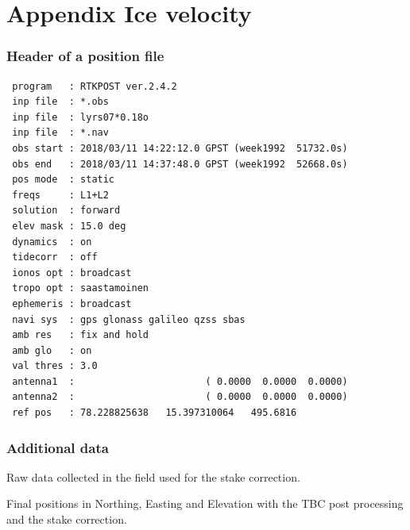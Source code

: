 

\chapter{Appendix Ice velocity}
\label{studentxx:appendix}

\subsection*{Header of a position file}
\begin{verbatim}
 program   : RTKPOST ver.2.4.2
 inp file  : *.obs
 inp file  : lyrs07*0.18o
 inp file  : *.nav
 obs start : 2018/03/11 14:22:12.0 GPST (week1992  51732.0s)
 obs end   : 2018/03/11 14:37:48.0 GPST (week1992  52668.0s)
 pos mode  : static
 freqs     : L1+L2
 solution  : forward
 elev mask : 15.0 deg
 dynamics  : on
 tidecorr  : off
 ionos opt : broadcast
 tropo opt : saastamoinen
 ephemeris : broadcast
 navi sys  : gps glonass galileo qzss sbas
 amb res   : fix and hold
 amb glo   : on
 val thres : 3.0
 antenna1  :                       ( 0.0000  0.0000  0.0000)
 antenna2  :                       ( 0.0000  0.0000  0.0000)
 ref pos   : 78.228825638   15.397310064   495.6816
\end{verbatim}

\subsection*{Additional data}

\begin{table}[h]
	\caption{Raw data collected in the field used for the stake correction.}
	\centering
	\begin{turn}{90}
		\scriptsize
		
		\label{GPS:tab:fb_other_tab}
	\end{turn}
\end{table}


\begin{table}[h]
	\caption{Final positions in Northing, Easting and Elevation with the TBC post processing and the stake correction.}
	\centering 
	
	\label{GPS:tab:tbc_tab}
\end{table}

